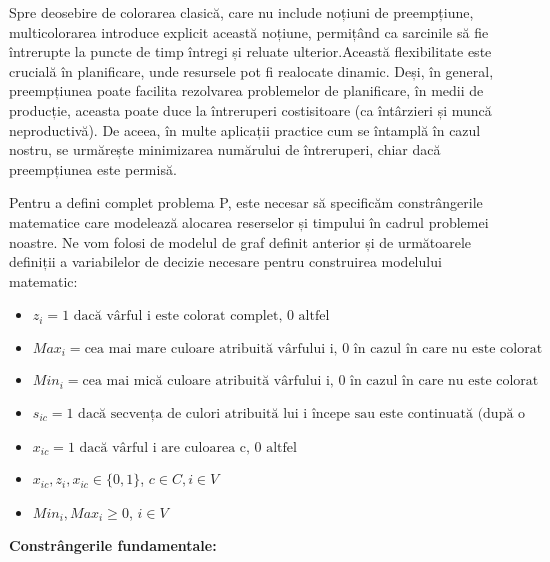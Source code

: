    Spre deosebire de colorarea clasică, care nu include noțiuni de preempțiune, multicolorarea introduce explicit această noțiune, permițând ca sarcinile să fie întrerupte la puncte de timp întregi și reluate ulterior.Această flexibilitate este crucială în planificare, unde resursele pot fi realocate dinamic. Deși, în general, preempțiunea poate facilita rezolvarea problemelor de planificare, în medii de producție, aceasta poate duce la întreruperi costisitoare (ca întârzieri și muncă neproductivă). De aceea, în multe aplicații practice cum se întamplă în cazul nostru, se urmărește minimizarea numărului de întreruperi, chiar dacă preempțiunea este permisă. 

    Pentru a defini complet problema P, este necesar să specificăm constrângerile matematice care modelează alocarea reserselor și timpului în cadrul problemei noastre. Ne vom folosi de modelul de graf definit anterior și de următoarele definiții a variabilelor de  decizie necesare pentru construirea modelului matematic:
    \begin{Def} 
    \begin{itemize}

      \item $z_i =1 \text{ dacă vârful i este colorat complet, 0 altfel}$
      \item $Max_i = \text{cea mai mare culoare atribuită vârfului i, 0 în cazul în care nu este colorat}$
      
      \item $Min_i = \text{cea mai mică culoare atribuită vârfului i, 0 în cazul în care nu este colorat}$
      \item $s_{ic} = \text{1 dacă secvența de culori atribuită lui i începe sau este continuată (după o întrerupere) cu culoarea c, 0 altfel}$
      \item $x_{ic} = \text{1 dacă vârful i are culoarea c, 0 altfel}$ 
      \item $x_{ic},z_i,x_{ic} \in \{0,1\}$, $c \in C, i \in V$
      \item $Min_i, Max_i \geq 0$, $i \in V$
    \end{itemize}
    \end{Def}
    {\bf Constrângerile fundamentale:}
